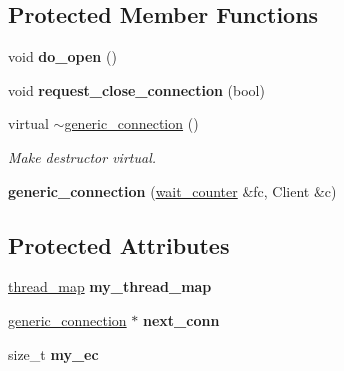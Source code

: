 \subsection*{Protected Member Functions}
\begin{DoxyCompactItemize}
\item 
\hypertarget{classrml_1_1internal_1_1generic__connection_a7b33255876d875d7926c81195afee1c5}{}void {\bfseries do\+\_\+open} ()\label{classrml_1_1internal_1_1generic__connection_a7b33255876d875d7926c81195afee1c5}

\item 
\hypertarget{classrml_1_1internal_1_1generic__connection_aa98a6bf770ba9dcec2f5738f3cfab760}{}void {\bfseries request\+\_\+close\+\_\+connection} (bool)\label{classrml_1_1internal_1_1generic__connection_aa98a6bf770ba9dcec2f5738f3cfab760}

\item 
\hypertarget{classrml_1_1internal_1_1generic__connection_aee2e3442e6b9d7aad6ba8c6a16db481e}{}virtual \hyperlink{classrml_1_1internal_1_1generic__connection_aee2e3442e6b9d7aad6ba8c6a16db481e}{$\sim$generic\+\_\+connection} ()\label{classrml_1_1internal_1_1generic__connection_aee2e3442e6b9d7aad6ba8c6a16db481e}

\begin{DoxyCompactList}\small\item\em Make destructor virtual. \end{DoxyCompactList}\item 
\hypertarget{classrml_1_1internal_1_1generic__connection_aba33b832a568b490cc171bd3b0e1d68c}{}{\bfseries generic\+\_\+connection} (\hyperlink{classrml_1_1internal_1_1wait__counter}{wait\+\_\+counter} \&fc, Client \&c)\label{classrml_1_1internal_1_1generic__connection_aba33b832a568b490cc171bd3b0e1d68c}

\end{DoxyCompactItemize}
\subsection*{Protected Attributes}
\begin{DoxyCompactItemize}
\item 
\hypertarget{classrml_1_1internal_1_1generic__connection_a5eaf5a77761d5fab3b70b14dca416972}{}\hyperlink{classrml_1_1internal_1_1thread__map}{thread\+\_\+map} {\bfseries my\+\_\+thread\+\_\+map}\label{classrml_1_1internal_1_1generic__connection_a5eaf5a77761d5fab3b70b14dca416972}

\item 
\hypertarget{classrml_1_1internal_1_1generic__connection_a8be4998d4f21c7fe494fc2e7be6b0d1d}{}\hyperlink{classrml_1_1internal_1_1generic__connection}{generic\+\_\+connection} $\ast$ {\bfseries next\+\_\+conn}\label{classrml_1_1internal_1_1generic__connection_a8be4998d4f21c7fe494fc2e7be6b0d1d}

\item 
\hypertarget{classrml_1_1internal_1_1generic__connection_a2f3d8377adfdbc956816384c448adcbe}{}size\+\_\+t {\bfseries my\+\_\+ec}\label{classrml_1_1internal_1_1generic__connection_a2f3d8377adfdbc956816384c448adcbe}

\end{DoxyCompactItemize}

